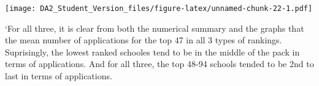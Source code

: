 \documentclass[]{article}
\begin{document}
\texttt{[image: DA2\_Student\_Version\_files/figure-latex/unnamed-chunk-22-1.pdf]}

`For all three, it is clear from both the numerical summary and the
graphs that the mean number of applications for the top 47 in all 3
types of rankings. Suprisingly, the lowest ranked schooles tend to be in
the middle of the pack in terms of applications. And for all three, the
top 48-94 schools tended to be 2nd to last in terms of applications.
\end{document}
